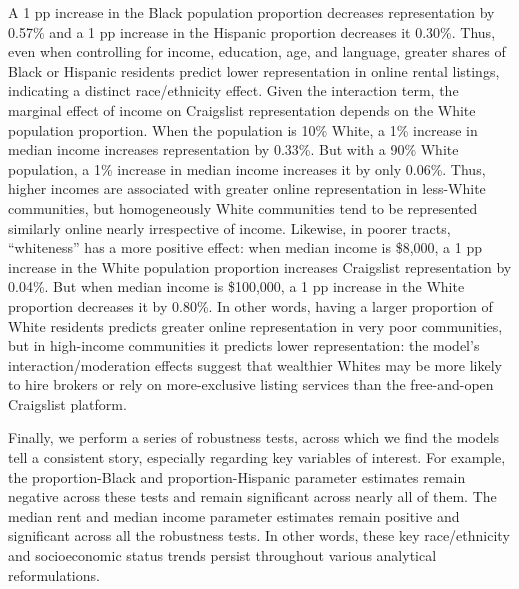 \documentclass[11pt,letterpaper]{article}
\begin{document}
A 1 pp increase in the Black population proportion decreases representation by 0.57\% and a 1 pp increase in the Hispanic proportion decreases it 0.30\%. Thus, even when controlling for income, education, age, and language, greater shares of Black or Hispanic residents predict lower representation in online rental listings, indicating a distinct race/ethnicity effect. Given the interaction term, the marginal effect of income on Craigslist representation depends on the White population proportion. When the population is 10\% White, a 1\% increase in median income increases representation by 0.33\%. But with a 90\% White population, a 1\% increase in median income increases it by only 0.06\%. Thus, higher incomes are associated with greater online representation in less-White communities, but homogeneously White communities tend to be represented similarly online nearly irrespective of income. Likewise, in poorer tracts, \enquote{whiteness} has a more positive effect: when median income is \$8,000, a 1 pp increase in the White population proportion increases Craigslist representation by 0.04\%. But when median income is \$100,000, a 1 pp increase in the White proportion decreases it by 0.80\%. In other words, having a larger proportion of White residents predicts greater online representation in very poor communities, but in high-income communities it predicts lower representation: the model's interaction/moderation effects suggest that wealthier Whites may be more likely to hire brokers or rely on more-exclusive listing services than the free-and-open Craigslist platform.

Finally, we perform a series of robustness tests, across which we find the models tell a consistent story, especially regarding key variables of interest. For example, the proportion-Black and proportion-Hispanic parameter estimates remain negative across these tests and remain significant across nearly all of them. The median rent and median income parameter estimates remain positive and significant across all the robustness tests. In other words, these key race/ethnicity and socioeconomic status trends persist throughout various analytical reformulations.
\end{document}
